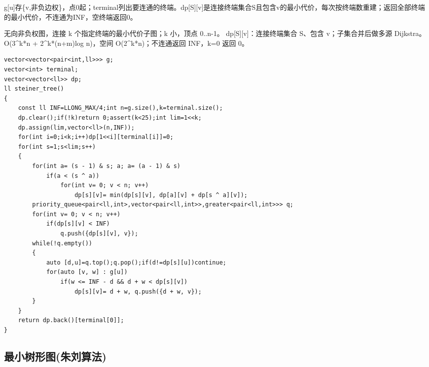 \documentclass[UTF8,fontset=fandol,a4paper,twoside]{ctexart}
\newcommand{\note}[1]{{\fontsize{10}{12}\selectfont #1\par}}
\begin{document}
\begin{multicols}{2}
\note{g[\allowbreak{}u]\allowbreak{}存\{v,\allowbreak{}非负边权\}，点0起；terminal列出要连通的终端。dp[\allowbreak{}S]\allowbreak{}[\allowbreak{}v]\allowbreak{}是连接终端集合S且包含v的最小代价，每次按终端数重建；返回全部终端的最小代价，不连通为INF，空终端返回0。}
\note{无向非负权图，连接 k 个指定终端的最小代价子图；k 小，顶点 0.\allowbreak{}.\allowbreak{}n-\allowbreak{}1。 dp[\allowbreak{}S]\allowbreak{}[\allowbreak{}v]\allowbreak{}：连接终端集合 S、包含 v；子集合并后做多源 Dijkstra。 O(\allowbreak{}3\textasciicircum{}k*n +\allowbreak{} 2\textasciicircum{}k*(\allowbreak{}n+\allowbreak{}m)\allowbreak{}log n)\allowbreak{}，空间 O(\allowbreak{}2\textasciicircum{}k*n)\allowbreak{}；不连通返回 INF，k=\allowbreak{}0 返回 0。}
\begin{lstlisting}
vector<vector<pair<int,ll>>> g;
vector<int> terminal;
vector<vector<ll>> dp;
ll steiner_tree()
{
    const ll INF=LLONG_MAX/4;int n=g.size(),k=terminal.size();
    dp.clear();if(!k)return 0;assert(k<25);int lim=1<<k;
    dp.assign(lim,vector<ll>(n,INF));
    for(int i=0;i<k;i++)dp[1<<i][terminal[i]]=0;
    for(int s=1;s<lim;s++)
    {
        for(int a= (s - 1) & s; a; a= (a - 1) & s)
            if(a < (s ^ a))
                for(int v= 0; v < n; v++)
                    dp[s][v]= min(dp[s][v], dp[a][v] + dp[s ^ a][v]);
        priority_queue<pair<ll,int>,vector<pair<ll,int>>,greater<pair<ll,int>>> q;
        for(int v= 0; v < n; v++)
            if(dp[s][v] < INF)
                q.push({dp[s][v], v});
        while(!q.empty())
        {
            auto [d,u]=q.top();q.pop();if(d!=dp[s][u])continue;
            for(auto [v, w] : g[u])
                if(w <= INF - d && d + w < dp[s][v])
                    dp[s][v]= d + w, q.push({d + w, v});
        }
    }
    return dp.back()[terminal[0]];
}
\end{lstlisting}
\subsection{最小树形图(朱刘算法)}


\end{multicols}
\end{document}
